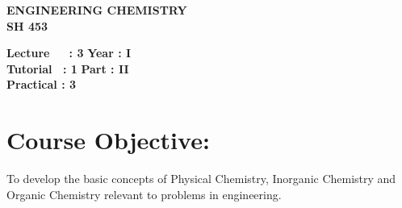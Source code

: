 \begin{center}
    \textbf{\huge{\uppercase{Engineering Chemistry}}}
    \\
    \vspace{.5cm}
    \textbf{\large{SH 453}}
\end{center}

\noindent\textbf{Lecture\ \ \ : 3} \hfill \textbf{Year : I } \\
\textbf{Tutorial \ : 1} \hfill \textbf{Part : II } \\
\textbf{Practical : 3}  \\

\par
\noindent 
\section*{Course Objective:}
To develop the basic concepts of Physical Chemistry, Inorganic Chemistry and Organic Chemistry relevant to problems in engineering.


